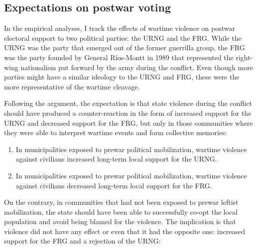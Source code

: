 \documentclass[12pt, notitlepage]{article}
\begin{document}
\subsection*{Expectations on postwar voting}


In the empirical analyses, I track the effects of wartime violence on postwar electoral support to two political parties: the URNG and the FRG.
While the URNG was the party that emerged out of the former guerrilla group, the FRG was the party founded by General Ríos-Montt in 1989 that represented the right-wing nationalism put forward by the army during the conflict.
Even though more parties might have a similar ideology to the URNG and FRG, these were the more representative of the wartime cleavage.

Following the argument, the expectation is that state violence during the conflict should have produced a counter-reaction in the form of increased support for the URNG and decreased support for the FRG, but only in those communities where they were able to interpret wartime events and form collective memories:

\begin{enumerate}[label={\bf H\arabic*:} , ref=H\arabic* , wide=0.5em, leftmargin=*]
  \item \label{h:URNG-mob} In municipalities exposed to prewar political mobilization, wartime violence against civilians increased long-term local support for the URNG.
  \item \label{h:FRG-mob} In municipalities exposed to prewar political mobilization, wartime violence against civilians decreased long-term local support for the FRG.
\end{enumerate}

On the contrary, in communities that had not been exposed to prewar leftist mobilization, the state should have been able to successfully co-opt the local population and avoid being blamed for the violence.
The implication is that violence did not have any effect or even that it had the opposite one: increased support for the FRG and a rejection of the URNG:
\end{document}
